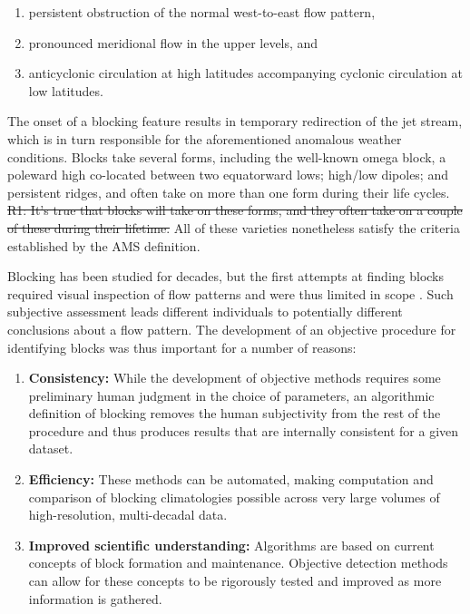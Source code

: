\documentclass[smallextended]{svjour3}       %
\numberwithin{equation}{section}
\begin{document}
\begin{enumerate}
\item persistent obstruction of the normal west-to-east flow pattern,
\item pronounced meridional flow in the upper levels, and
\item anticyclonic circulation at high latitudes accompanying cyclonic circulation at low latitudes.
\end{enumerate}

The onset of a blocking feature results in temporary redirection of the jet stream, which is in turn responsible for the aforementioned anomalous weather conditions. Blocks take several forms, including the well-known omega block, a poleward high co-located between two equatorward lows; high/low dipoles; and persistent ridges{\color{blue}, and often take on more than one form during their life cycles}. 
{\color{purple}\sout{R1: It's true that blocks will take on these forms, and they often take on a couple of these during their lifetime.}}
All of these varieties nonetheless satisfy the criteria established by the AMS definition. 

Blocking has been studied for decades, but the first attempts at finding blocks required visual inspection of flow patterns and were thus limited in scope \citep{rex_blocking_1950}.  Such subjective assessment leads different individuals to potentially different conclusions about a flow pattern. The development of an objective procedure for identifying blocks was thus important for a number of reasons:

\begin{enumerate}
\item \textbf{Consistency:} While the development of objective methods requires some preliminary human judgment in the choice of parameters, an algorithmic definition of blocking removes the human subjectivity from the rest of the procedure and thus produces results that are internally consistent for a given dataset.
\item \textbf{Efficiency:} These methods can be automated, making computation and comparison of blocking climatologies possible across very large volumes of high-resolution, multi-decadal data.
\item \textbf{Improved scientific understanding:} Algorithms are based on current concepts of block formation and maintenance. Objective detection methods can allow for these concepts to be rigorously tested and improved as more information is gathered.
\end{enumerate}
\end{document}
